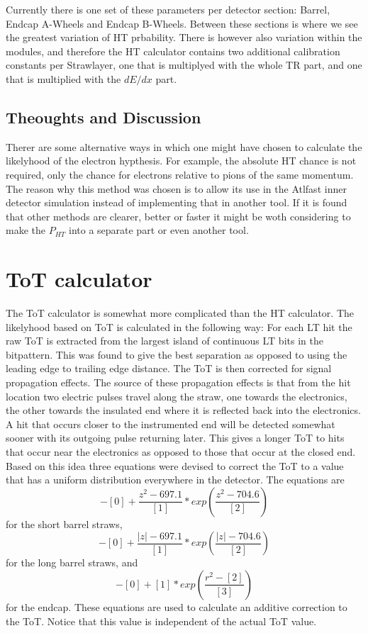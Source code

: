 \documentclass[a4paper,11pt]{article}
\begin{document}
Currently there is one set of these parameters per detector section:
Barrel, Endcap A-Wheels and Endcap B-Wheels. Between these sections is
where we see the greatest variation of HT prbability. There is however
also variation within the modules, and therefore the HT calculator
contains two additional calibration constants per Strawlayer, one that
is multiplyed with the whole TR part, and one that is multiplied with
the $dE/dx$ part.

\subsection{Theoughts and Discussion}

Therer are some alternative ways in which one might have chosen to
calculate the likelyhood of the electron hypthesis. For example, the
absolute HT chance is not required, only the chance for electrons
relative to pions of the same momentum. The reason why this method was
chosen is to allow its use in the Atlfast inner detector simulation
instead of implementing that in another tool. If it is found that
other methods are clearer, better or faster it might be woth
considering to make the $P_{HT}$ into a separate part or even another
tool.

\section{ToT calculator}
\label{ToTcalculator}

The ToT calculator is somewhat more complicated than the HT
calculator. The likelyhood based on ToT is calculated in the following
way: For each LT hit the raw ToT is extracted from the largest island
of continuous LT bits in the bitpattern. This was found to give the
best separation as opposed to using the leading edge to trailing edge
distance. The ToT is then corrected for signal propagation
effects. The source of these propagation effects is that from the hit
location two electric pulses travel along the straw, one towards the
electronics, the other towards the insulated end where it is reflected
back into the electronics. A hit that occurs closer to the
instrumented end will be detected somewhat sooner with its outgoing
pulse returning later. This gives a longer ToT to hits that occur near
the electronics as opposed to those that occur at the closed
end. Based on this idea three equations were devised to correct the
ToT to a value that has a uniform distribution everywhere in the
detector. The equations are
\begin{equation}
\label{shortstrawcorr}
  - [0] +\frac{z^2 -697.1}{[1]} * exp( \frac{z^2-704.6}{[2]})
\end{equation}
for the short barrel straws,
\begin{equation}
  -[0] + \frac{|z|-697.1}{[1]} * exp(\frac{|z|-704.6}{[2]})
\end{equation}
for the long barrel straws, and
\begin{equation}
  \label{endcapcorr}
  -[0] +[1]*exp(\frac{r^2-[2]}{[3]})
\end{equation}
for the endcap.  These equations are used to calculate an additive
correction to the ToT. Notice that this value is independent of the
actual ToT value.
\end{document}
